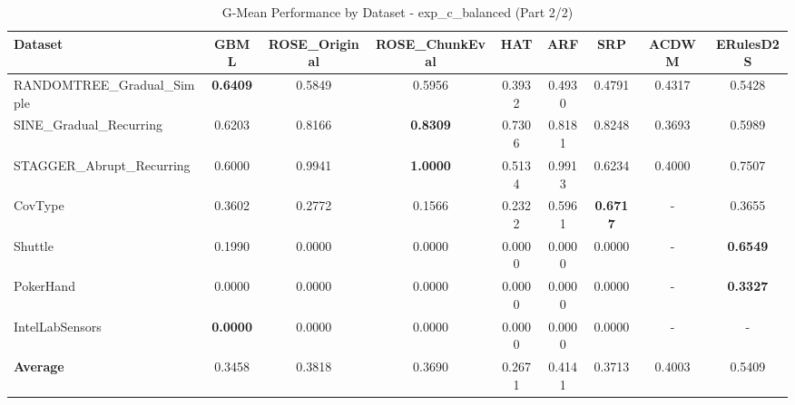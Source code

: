 \begin{table}[htbp]
\centering
\caption{G-Mean Performance by Dataset - exp_c_balanced (Part 2/2)}
\label{tab:gmean_exp_c_balanced_2}
\footnotesize
\begin{tabular}{lcccccccc}
\toprule
Dataset & GBML & ROSE_Original & ROSE_ChunkEval & HAT & ARF & SRP & ACDWM & ERulesD2S \\
\midrule
RANDOMTREE_Gradual_Simple & \textbf{0.6409} & 0.5849 & 0.5956 & 0.3932 & 0.4930 & 0.4791 & 0.4317 & 0.5428 \\
SINE_Gradual_Recurring & 0.6203 & 0.8166 & \textbf{0.8309} & 0.7306 & 0.8181 & 0.8248 & 0.3693 & 0.5989 \\
STAGGER_Abrupt_Recurring & 0.6000 & 0.9941 & \textbf{1.0000} & 0.5134 & 0.9913 & 0.6234 & 0.4000 & 0.7507 \\
CovType & 0.3602 & 0.2772 & 0.1566 & 0.2322 & 0.5961 & \textbf{0.6717} & - & 0.3655 \\
Shuttle & 0.1990 & 0.0000 & 0.0000 & 0.0000 & 0.0000 & 0.0000 & - & \textbf{0.6549} \\
PokerHand & 0.0000 & 0.0000 & 0.0000 & 0.0000 & 0.0000 & 0.0000 & - & \textbf{0.3327} \\
IntelLabSensors & \textbf{0.0000} & 0.0000 & 0.0000 & 0.0000 & 0.0000 & 0.0000 & - & - \\
\midrule
\textbf{Average} & 0.3458 & 0.3818 & 0.3690 & 0.2671 & 0.4141 & 0.3713 & 0.4003 & 0.5409 \\
\bottomrule
\end{tabular}
\end{table}